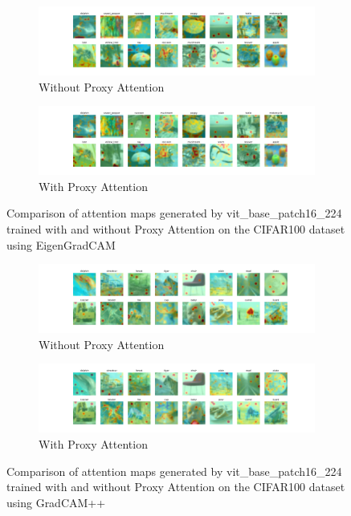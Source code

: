 \documentclass[a4paper,11pt,openright]{book}
\begin{document}
\begin{figure}[!htb]
    \centering
    \begin{subfigure}[b]{1\textwidth}
        \includegraphics[width=\textwidth]{images/gpp_cifar100_vit_base_patch16_224_noproxy_3.pdf}
        \caption{Without Proxy Attention}
    \end{subfigure}
    \hfill
    \begin{subfigure}[b]{1\textwidth}
        \includegraphics[width=\textwidth]{images/gpp_cifar100_vit_base_patch16_224_proxy_3.pdf}
        \caption{With Proxy Attention}
    \end{subfigure}
    \caption{Comparison of attention maps generated by vit\_base\_patch16\_224 trained with and without Proxy Attention on the CIFAR100 dataset using EigenGradCAM}
\end{figure}



\begin{figure}[!htb]
    \centering
    \begin{subfigure}[b]{1\textwidth}
        \includegraphics[width=\textwidth]{images/cifar100_vit_base_patch16_224_noproxy_1.pdf}
        \caption{Without Proxy Attention}
    \end{subfigure}
    \hfill
    \begin{subfigure}[b]{1\textwidth}
        \includegraphics[width=\textwidth]{images/cifar100_vit_base_patch16_224_proxy_1.pdf}
        \caption{With Proxy Attention}
    \end{subfigure}
    \caption{Comparison of attention maps generated by vit\_base\_patch16\_224 trained with and without Proxy Attention on the CIFAR100 dataset using GradCAM++}
\end{figure}
\end{document}
